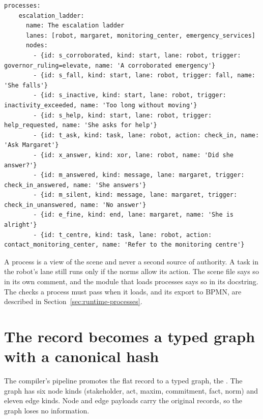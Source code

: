 \begin{lstlisting}[caption={The opening of the escalation ladder (lines 1085 to 1099)}, label={lst:scene-ladder}]
  processes:
    escalation_ladder:
      name: The escalation ladder
      lanes: [robot, margaret, monitoring_center, emergency_services]
      nodes:
        - {id: s_corroborated, kind: start, lane: robot, trigger: governor_ruling=elevate, name: 'A corroborated emergency'}
        - {id: s_fall, kind: start, lane: robot, trigger: fall, name: 'She falls'}
        - {id: s_inactive, kind: start, lane: robot, trigger: inactivity_exceeded, name: 'Too long without moving'}
        - {id: s_help, kind: start, lane: robot, trigger: help_requested, name: 'She asks for help'}
        - {id: t_ask, kind: task, lane: robot, action: check_in, name: 'Ask Margaret'}
        - {id: x_answer, kind: xor, lane: robot, name: 'Did she answer?'}
        - {id: m_answered, kind: message, lane: margaret, trigger: check_in_answered, name: 'She answers'}
        - {id: m_silent, kind: message, lane: margaret, trigger: check_in_unanswered, name: 'No answer'}
        - {id: e_fine, kind: end, lane: margaret, name: 'She is alright'}
        - {id: t_centre, kind: task, lane: robot, action: contact_monitoring_center, name: 'Refer to the monitoring centre'}
\end{lstlisting}

A process is a view of the scene and never a second source of authority. A task in the robot's lane
still runs only if the norms allow its action. The scene file says so in its own comment, and the
module that loads processes says so in its docstring. The checks a process must pass when it loads,
and its export to BPMN, are described in Section~\ref{sec:runtime-processes}.

\section{The record becomes a typed graph with a canonical hash}\label{sec:erisml-graph}

The compiler's pipeline promotes the flat record to a typed graph, the . The graph
has six node kinds (stakeholder, act, maxim, commitment, fact, norm) and eleven edge kinds. Node and
edge payloads carry the original records, so the graph loses no information.

